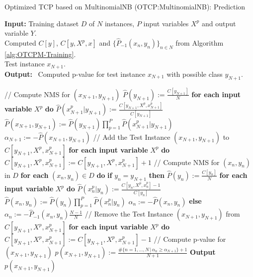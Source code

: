 \documentclass[10pt]{reportMaster}
\begin{document}
\begin{algorithm}[H]
\caption{Optimized TCP based on MultinomialNB (OTCP:MultinomialNB): Prediction}\label{alg:OTCPM-Prediction}
\textbf{Input:} \; \; Training dataset $D$ of $N$ instances, $P$ input variables $X^p$ and output variable $Y$.\\
\hspace*{\algorithmicindent} \quad \quad \; \; Computed $C[y]$, $C[y, X^p,x]$ and $\{\hat{P}_{-1}(x_n,y_n)\}_{n \in N}$ from Algorithm \ref{alg:OTCPM-Training}.\\
\hspace*{\algorithmicindent} \quad \quad \; \; Test instance $x_{N+1}$.\\
\textbf{Output:} \, Computed p-value for test instance $x_{N+1}$ with possible class $y_{N+1}$.
\begin{algorithmic}[1]
\State // Compute NMS for $(x_{N+1},y_{N+1})$
\State $\hat{P}(y_{N+1}) := \frac{C[y_{N+1}]}{N}$
\State \textbf{for each input variable} $X^p$ \textbf{do}
\State \qquad $\hat{P}(x_{N+1}^p|y_{N+1}):=\frac{C[y_{N+1},X^p,x_{N+1}^p]}{C[y_{N+1}]}$
\State $\hat{P}(x_{N+1},y_{N+1}):=\hat{P}(y_{N+1}) \prod_{p=1}^P \hat{P}(x_{N+1}^p|y_{N+1})$
\State $\alpha_{N+1} := -\hat{P}(x_{N+1}, y_{N+1})$
\State // Add the Test Instance $(x_{N+1},y_{N+1})$ to $C[y_{N+1},X^p,x_{N+1}^p]$
\State \textbf{for each input variable} $X^p$ \textbf{do}
\State \qquad $C[y_{N+1},X^p,x_{N+1}^p]:=C[y_{N+1},X^p,x_{N+1}^p]+1$
\State // Compute NMS for $(x_n,y_n)$ in $D$
\State \textbf{for each} $(x_n,y_n) \in D$ \textbf{do}
\State \qquad \textbf{if} $y_n=y_{N+1}$ \textbf{then}
\State \qquad \qquad $\hat{P}(y_n) := \frac{C[y_n]}{N}$
\State \qquad \qquad \textbf{for each input variable} $X^p$ \textbf{do}
\State \qquad \qquad \qquad $\hat{P}(x_n^p|y_n):=\frac{C[y_n,X^p,x_n^p]-1}{C[y_n]}$
\State \qquad \qquad $\hat{P}(x_n,y_n):=\hat{P}(y_n) \prod_{p=1}^P \hat{P}(x_n^p|y_n)$
\State \qquad \qquad $\alpha_n := -\hat{P}(x_n, y_n)$
\State \qquad \textbf{else}
\State \qquad \qquad $\alpha_n := -\hat{P}_{-1}(x_n, y_n) \frac{N-1}{N}$
\State // Remove the Test Instance $(x_{N+1},y_{N+1})$ from $C[y_{N+1},X^p,x_{N+1}^p]$
\State \textbf{for each input variable} $X^p$ \textbf{do}
\State \qquad $C[y_{N+1},X^p,x_{N+1}^p]:=C[y_{N+1},X^p,x_{N+1}^p]-1$
\State // Compute p-value for $(x_{N+1},y_{N+1})$
\State $p(x_{N+1},y_{N+1}):=\frac{\#\{n=1,...,N \,|\, \alpha_n \geq \alpha_{N+1}\}+1}{N+1}$
\State \textbf{Output} $p(x_{N+1},y_{N+1})$
\end{algorithmic}
\end{algorithm}
\end{document}
